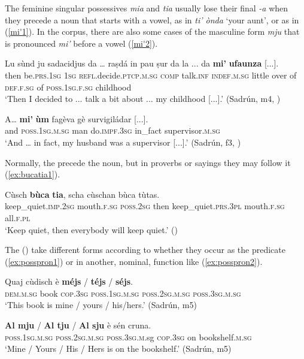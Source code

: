 The feminine singular possessives \textit{mia} and \textit{tia} usually lose their final \textit{-a} when they precede a noun that starts with a vowel, as in \textit{ti' ònda} `your aunt', or as in (\ref{mi'1}). In the corpus, there are also some cases of the masculine form \textit{mju} that is pronounced \textit{mi'} before a vowel (\ref{mi'2}).

\ea
\label{mi'1}
\gll Lu sùnd ju sadacidjus da … raṣdá in pau ṣur da la ... da \textbf{mi’} \textbf{ufaunza} [...]. \\
then  be.\textsc{prs.1sg} \textsc{1sg}  \textsc{refl}.decide.\textsc{ptcp.m.sg} \textsc{comp} {} talk.\textsc{inf} \textsc{indef.m.sg} little over of  \textsc{def.f.sg} {} of  \textsc{poss.1sg.f.sg} childhood\\
\glt `Then I decided to ... talk a bit about ... my childhood [...].' (Sadrún, m4, )
\z

\ea
\label{mi'2}
\gll  A… \textbf{mi'} \textbf{ùm} fagèva gè survigiládar [...].  \\
and \textsc{poss.1sg.m.sg} man do.\textsc{impf.3sg} in\_fact supervisor.\textsc{m.sg}\\
\glt `And … in fact, my husband was a supervisor [...].' (Sadrún, f3, )
\z

Normally, the  precede the noun, but in proverbs or sayings they may follow it (\ref{ex:bucatia1}).

\ea\label{ex:bucatia1}
\gll Cùsch \textbf{bùca} \textbf{tia}, scha cùschan bùca tùtas.\\
keep\_quiet.\textsc{imp.2sg} mouth.\textsc{f.sg} \textsc{poss.2sg} then keep\_quiet.\textsc{prs.3pl} mouth.\textsc{f.sg} all.\textsc{f.pl}\\
\glt `Keep quiet, then everybody will keep quiet.' (\citealt[100]{Büchli1966})
\z

The  () take different forms according to whether they occur as the predicate (\ref{ex:posspron1}) or in another, nominal, function like (\ref{ex:posspron2}).

\ea\label{ex:posspron1}
\gll Quaj cùdisch è \textbf{méjs} / \textbf{téjs} / \textbf{séjs}.\\
\textsc{dem.m.sg} book \textsc{cop.3sg} \textsc{poss.1sg.m.sg} {} \textsc{poss.2sg.m.sg} {} \textsc{poss.3sg.m.sg} \\
\glt `This book is mine / yours / his/hers.' (Sadrún, m5)
\z

\ea
\label{ex:posspron2}
\gll \textbf{Al mju} / \textbf{Al tju} / \textbf{Al sju} è sén cruna.\\
\textsc{poss.1sg.m.sg} {} \textsc{poss.2sg.m.sg} {} \textsc{poss.3sg.m}.sg \textsc{cop.3sg} on bookshelf.\textsc{m.sg}   \\
\glt `Mine / Yours / His / Hers is on the bookshelf.' (Sadrún, m5)
\z

